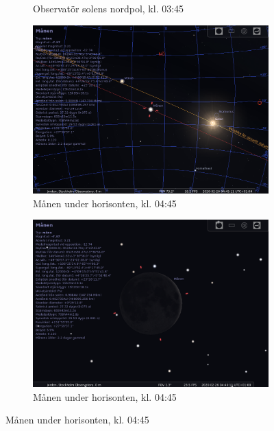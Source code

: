 \documentclass[./exercises.tex]{subfiles}
\begin{document}
\begin{itemize}
\begin{figure}[H]
\begin{subfigure}[b]{0.45\textwidth}
         \caption{Observatör solens nordpol, kl. 03:45}
         \label{fig:three sin x}
     \end{subfigure}
     \hfill
     \begin{subfigure}[b]{0.45\textwidth}
         \centering
         \includegraphics[width=\textwidth]{Stellarium1/RealNewMoon/stellarium-002.png}
         \caption{Månen under horisonten, kl. 04:45}
         \label{fig:three sin x}
     \end{subfigure}
     \hfill
     \begin{subfigure}[b]{0.45\textwidth}
         \centering
         \includegraphics[width=\textwidth]{Stellarium1/RealNewMoon/stellarium-003.png}
         \caption{Månen under horisonten, kl. 04:45}
         \label{fig:three sin x}
     \end{subfigure}

\end{figure}
\end{itemize}
\end{document}
